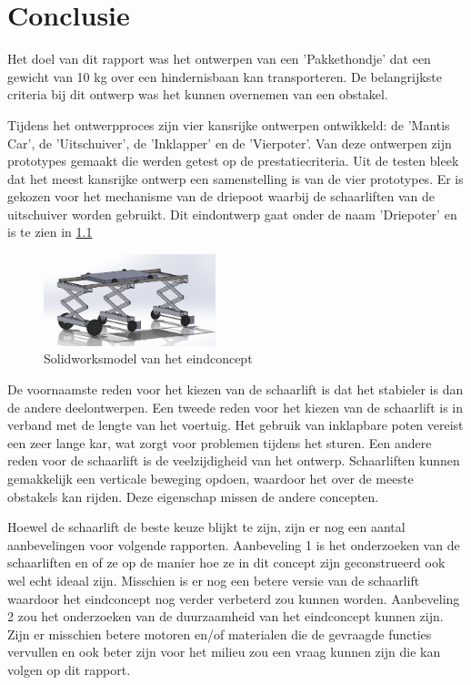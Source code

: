 \chapter{Conclusie}
\label{cha:conclusie}
Het doel van dit rapport was het ontwerpen van een 'Pakkethondje' dat een gewicht van 10 kg over een hindernisbaan kan transporteren. De belangrijkste criteria bij dit ontwerp was het kunnen overnemen van een obstakel. 

\vspace{\baselineskip}
Tijdens het ontwerpproces zijn vier kansrijke ontwerpen ontwikkeld: de 'Mantis Car', de 'Uitschuiver', de 'Inklapper' en de 'Vierpoter'. Van deze ontwerpen zijn prototypes gemaakt die werden getest op de prestatiecriteria. Uit de testen bleek dat het meest kansrijke ontwerp een samenstelling is van de vier prototypes. Er is gekozen voor het mechanisme van de driepoot waarbij de schaarliften van de uitschuiver worden gebruikt. Dit eindontwerp gaat onder de naam 'Driepoter' en is te zien in \cref{fig:eindconcept}

\begin{figure}
    \centering
    \includegraphics[width = 50mm]{05_conclusie/eindconcept.jpg}
    \caption{Solidworksmodel van het eindconcept}
    \label{fig:eindconcept}
\end{figure}

\vspace{\baselineskip}
De voornaamste reden voor het kiezen van de schaarlift is dat het stabieler is dan de andere deelontwerpen. Een tweede reden voor het kiezen van de schaarlift is in verband met de lengte van het voertuig. Het gebruik van inklapbare poten vereist een zeer lange kar, wat zorgt voor problemen tijdens het sturen.  Een andere reden voor de schaarlift is de veelzijdigheid van het ontwerp. Schaarliften kunnen gemakkelijk een verticale beweging opdoen, waardoor het over de meeste obstakels kan rijden. Deze eigenschap missen de andere concepten.

Hoewel de schaarlift de beste keuze blijkt te zijn, zijn er nog een aantal aanbevelingen voor volgende rapporten. Aanbeveling 1 is het onderzoeken van de schaarliften en of ze op de manier hoe ze in dit concept zijn geconstrueerd ook wel echt ideaal zijn. Misschien is er nog een betere versie van de schaarlift waardoor het eindconcept nog verder verbeterd zou kunnen worden. Aanbeveling 2 zou het onderzoeken van de duurzaamheid van het eindconcept kunnen zijn. Zijn er misschien betere motoren en/of materialen die de gevraagde functies vervullen en ook beter zijn voor het milieu zou een vraag kunnen zijn die kan volgen op dit rapport.



